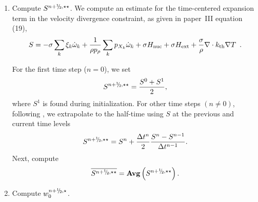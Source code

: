 \begin{description}
\begin{enumerate}
\renewcommand{\theenumi}{{\bf \Alph{enumi}}}

\item Compute $S^{\nph,\star\star}$.  We compute an estimate for the
  time-centered expansion term in the velocity divergence constraint,
  as given in paper~III equation (19),
\begin{equation}
  S =  -\sigma  \sum_k  \xi_k \dot{\omega}_k  + 
  \frac{1}{\rho p_\rho} \sum_k p_{X_k}  {\dot{\omega}}_k  + \sigma {H_{\rm nuc}} + \sigma {H_{\rm ext}} 
  + \frac{\sigma}{\rho}\nabla\cdot k_{\rm th}\nabla T \enskip .
\label{eq:defineS} 
\end{equation}

  For the first time step ($n=0$), we set
\begin{equation}
S^{n+\myhalf,\star\star} = \frac{S^0 + S^1}{2},
\end{equation}
  where $S^1$ is found during initialization.  For other time steps
  $(n \ne 0)$, following \cite{SNe}, we extrapolate
  to the half-time using $S$ at the previous and current
  time levels
\begin{equation}
S^{\nph,\star\star} = S^n + \frac{\dt^n}{2} \frac{S^n - S^{n-1}}{\dt^{n-1}}.
\end{equation}
  Next, compute
\begin{equation}
\overline{S^{\nph,\star\star}} = {\mathrm{\bf Avg}} \left(S^{\nph,\star\star}\right).
\end{equation}

\item Compute $w_0^{\nph,\star}$.


\end{enumerate}
\end{description}
